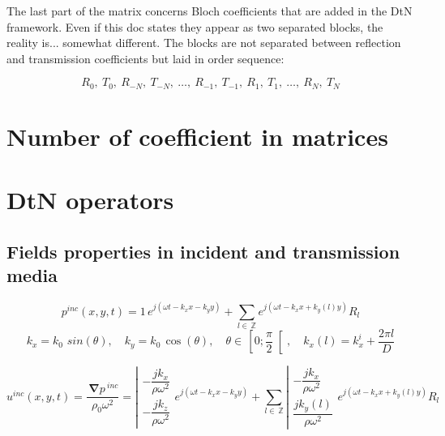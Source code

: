 \documentclass[11pt,A4paper]{book}
\newcommand{\ds}{\displaystyle}
\newcommand{\mb}{\, \mathbb}
\newcommand{\esp}{, \quad}
\newcommand{\Gd}[1]{\,\boldsymbol{\nabla}#1\,}
\renewcommand{\:}{\tb{:}}
\begin{document}
The last part of the matrix concerns Bloch coefficients that are added in the DtN
framework. Even if this doc states they appear as two separated blocks, the reality is...
somewhat different. The blocks are not separated between reflection and transmission
coefficients but laid in order sequence:

\begin{equation}
	R_0,~T_0,~R_{-N},~T_{-N},~\ldots,~R_{-1},~T_{-1},~R_1,~T_1,~\ldots,~R_N,~T_N
\end{equation}



\section{Number of coefficient in matrices}



\section{DtN operators}

\subsection{Fields properties in incident and transmission media}


\begin{equation}
p^{inc}(x,y,t)=1\, e^{j(\omega t- k_x x-k_y y)}+\ds{\sum_{l\in\mb{Z}}} 
e^{j(\omega t- k_x x+k_y(l) y)}R_l
\end{equation}
\begin{equation}
k_x=k_0\,\,sin(\theta)\esp k_y=k_0\,\cos(\theta) \esp \theta\in \,\left[0;\dfrac{\pi}{2}\right[ \esp k_x(l)=k_x^i+\dfrac{2\pi l}{D}
\end{equation}

\begin{equation}
u^{inc}(x,y,t)=\dfrac{\Gd p^{inc}}{\rho_0\omega^2}=\left| 
\begin{array}{c}
{-\dfrac{j k_x}{\rho\omega^2}}\\
{-\dfrac{j k_z}{\rho\omega^2}}
\end{array}
\right.
e^{j(\omega t- k_x x-k_y y)}+
\ds{\sum_{l\in\mb{Z}}}
\left| 
\begin{array}{c}
{-\dfrac{j k_x}{\rho\omega^2}}\\
{ \dfrac{j k_y(l)}{\rho\omega^2}}
\end{array}
\right. 
e^{j(\omega t- k_x x+k_y(l) y)}R_l
\end{equation}
\end{document}
